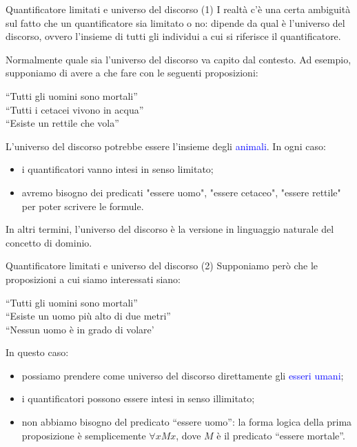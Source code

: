 \documentclass[10pt,dvipsnames,xcolor=table,handout]{beamer}
\begin{document}
\begin{frame}{Quantificatore limitati e universo del discorso (1)}
    I realtà c'è una certa ambiguità sul fatto che un quantificatore sia limitato o no: dipende da qual è l'\alert{universo del discorso}, ovvero l'insieme di tutti gli individui a cui si riferisce il quantificatore.

    \medskip
    Normalmente quale sia l'universo del discorso va capito dal contesto. Ad esempio, supponiamo di avere a che fare con le seguenti proposizioni:
    \begin{center}
        ``Tutti gli uomini sono mortali''\\
        ``Tutti i cetacei vivono in acqua''\\
        ``Esiste un rettile che vola''
    \end{center}
    L'universo del discorso potrebbe essere l'insieme degli \textcolor{blue}{animali}. In ogni caso:
    \begin{itemize}
        \item  i quantificatori vanno intesi in senso limitato;
        \item avremo bisogno dei predicati "essere uomo", "essere cetaceo", "essere rettile" per poter scrivere le formule.
    \end{itemize}
    \medskip
    In altri termini, l'universo del discorso è la versione in linguaggio naturale del concetto di dominio.
\end{frame}

\begin{frame}{Quantificatore limitati e universo del discorso (2)}
    Supponiamo però che le proposizioni a cui siamo interessati siano:
    \begin{center}
        ``Tutti gli uomini sono mortali''\\
        ``Esiste un uomo più alto di due metri''\\
        ``Nessun uomo è in grado di volare'
    \end{center}
    In questo caso:
    \begin{itemize}
        \item possiamo prendere come universo del discorso direttamente gli \textcolor{blue}{esseri umani};
        \item i quantificatori possono essere intesi in senso illimitato;
        \item non abbiamo bisogno del predicato ``essere uomo'': la forma logica della prima proposizione è semplicemente $\forall x Mx$, dove $M$ è il predicato ``essere mortale''.
    \end{itemize}
\end{frame}
\end{document}
